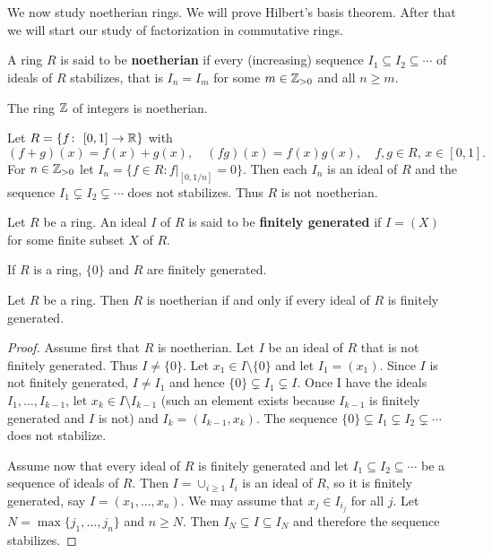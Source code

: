\chapter{}

We now study noetherian rings. We will prove Hilbert's basis 
theorem. After that we will start our study of factorization
in commutative rings. 

\begin{definition}
	A ring $R$ is said to be \textbf{noetherian} if every (increasing)
	sequence $I_1\subseteq I_2\subseteq\cdots$ of ideals of $R$
	stabilizes, that is $I_n=I_m$ for some $m\in\mathbb{Z}_{>0}$ and all $n\geq m$. 
\end{definition}

The ring $\mathbb{Z}$ of integers is noetherian.

\begin{example}
Let $R=\{f\colon [0,1]\to\R\}$ with 
\[
(f+g)(x)=f(x)+g(x),
\quad
(fg)(x)=f(x)g(x),
\quad
f,g\in R,\,x\in [0,1].
\]
For $n\in\mathbb{Z}_{>0}$ let
$I_n=\{f\in R:f|_{[0,1/n]}=0\}$. Then each $I_n$ is an ideal of $R$ and 
the sequence 
$I_1\subsetneq I_2\subsetneq\cdots$ 
does not stabilizes. Thus $R$ is not noetherian. 
\end{example}

\begin{definition}
	Let $R$ be a ring. An ideal $I$ of $R$ is said to be \textbf{finitely generated} if $I=(X)$ for some
	finite subset $X$ of $R$. 
\end{definition}

If $R$ is a ring, $\{0\}$ and $R$ are finitely generated. 

\begin{proposition}
Let $R$ be a ring. Then $R$ is noetherian if and only 
if every ideal of $R$ is finitely generated. 	
\end{proposition}

\begin{proof}
	Assume first that $R$ is noetherian. Let $I$ be an ideal of $R$ that is not finitely generated. 
	Thus $I\ne\{0\}$. Let $x_1\in I\setminus\{0\}$ and let $I_1=(x_1)$. Since $I$ is not finitely
	generated, $I\ne I_1$ and hence   
	$\{0\}\subsetneq I_1\subsetneq I$. Once I have the ideals $I_1,\dots,I_{k-1}$, let 
	$x_k\in I\setminus I_{k-1}$ (such an element exists because $I_{k-1}$ is finitely generated
	and $I$ is not) and $I_k=(I_{k-1},x_k)$. The sequence
	$\{0\}\subsetneq I_1\subsetneq I_2\subsetneq\cdots$ does not stabilize.  
	
	Assume now that every ideal of $R$ is finitely generated and 
	let $I_1\subseteq I_2\subseteq\cdots$ be a sequence of ideals of $R$. Then
	$I=\cup_{i\geq1}I_i$ is an ideal of $R$, so it is finitely generated, say
	$I=(x_1,\dots,x_n)$. We may assume that $x_j\in I_{i_j}$ for all $j$. Let 
	$N=\max\{j_1,\dots,j_n\}$ and $n\geq N$. Then 
	$I_N\subseteq I\subseteq I_N$ and therefore the sequence stabilizes.  
\end{proof}

